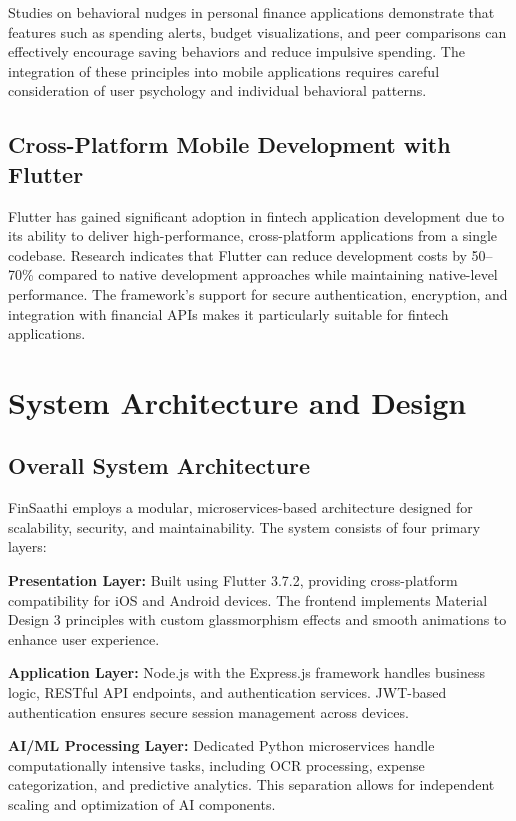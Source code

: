 \documentclass[10pt,twocolumn,twoside,a4paper]{article}
\begin{document}
Studies on behavioral nudges in personal finance applications demonstrate that features such as spending alerts, budget visualizations, and peer comparisons can effectively encourage saving behaviors and reduce impulsive spending. The integration of these principles into mobile applications requires careful consideration of user psychology and individual behavioral patterns.

\subsection{Cross-Platform Mobile Development with Flutter}
Flutter has gained significant adoption in fintech application development due to its ability to deliver high-performance, cross-platform applications from a single codebase. Research indicates that Flutter can reduce development costs by 50--70\% compared to native development approaches while maintaining native-level performance. The framework's support for secure authentication, encryption, and integration with financial APIs makes it particularly suitable for fintech applications.

\section{System Architecture and Design}
\subsection{Overall System Architecture}
FinSaathi employs a modular, microservices-based architecture designed for scalability, security, and maintainability. The system consists of four primary layers:

\textbf{Presentation Layer:} Built using Flutter 3.7.2, providing cross-platform compatibility for iOS and Android devices. The frontend implements Material Design 3 principles with custom glassmorphism effects and smooth animations to enhance user experience.

\textbf{Application Layer:} Node.js with the Express.js framework handles business logic, RESTful API endpoints, and authentication services. JWT-based authentication ensures secure session management across devices.

\textbf{AI/ML Processing Layer:} Dedicated Python microservices handle computationally intensive tasks, including OCR processing, expense categorization, and predictive analytics. This separation allows for independent scaling and optimization of AI components.
\end{document}
